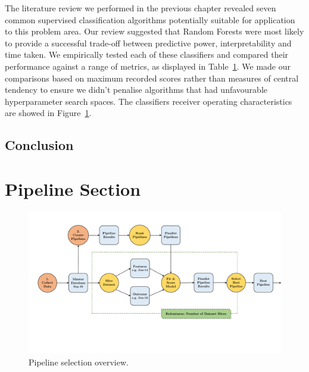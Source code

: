 \documentclass[../thesis/thesis.tex]{subfiles}
\begin{document}
The literature review we performed in the previous chapter revealed seven common supervised classification algorithms potentially suitable for application to this problem area. Our review suggested that Random Forests were most likely to provide a successful trade-off between predictive power, interpretability and time taken. We empirically tested each of these classifiers and compared their performance against a range of metrics, as displayed in Table~\ref{}. We made our comparisons based on maximum recorded scores rather than measures of central tendency to ensure we didn't penalise algorithms that had unfavourable hyperparameter search spaces. The classifiers receiver operating characteristics are showed in Figure~\ref{}.




\subsection{Conclusion}


\section{Pipeline Section}


\begin{figure}[!htb]
    \centering
    \includegraphics[width=\textwidth]{../figures/design/pipeline_selection}
    \caption{Pipeline selection overview.}
    \label{fig:design:pipeline_selection}
\end{figure}
\end{document}
